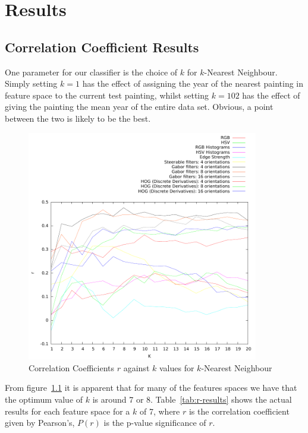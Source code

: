 \chapter{Results}

\section{Correlation Coefficient Results}
One parameter for our classifier is the choice of $k$ for $k$-Nearest Neighbour. Simply setting 
$k=1$ has the effect of assigning the year of the nearest painting in feature space to the current
test painting, whilst setting $k=102$ has the effect of giving the painting the mean year of the 
entire data set. Obvious, a point between the two is likely to be the best. 

\begin{figure}[h]
\centering
\includegraphics[width=0.9\textwidth]{../../isispa-paper/results/mean}
\caption{Correlation Coefficients $r$ against $k$ values for $k$-Nearest Neighbour}\label{fig:r-graph}
\end{figure}

From figure~\ref{fig:r-graph} it is apparent that for many of the features spaces we have that the 
optimum value of $k$ is around 7 or 8. Table~\ref{tab:r-results} shows the actual results for each 
feature space for a $k$ of 7, where $r$ is the correlation coefficient given by Pearson's, 
$P(r)$ is the p-value significance of $r$.

